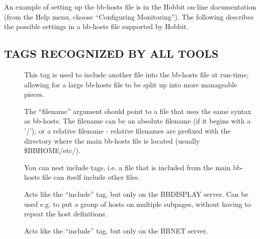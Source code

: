   An example of setting up the bb-hosts file is in the Hobbit on-line
  documentation (from the Help menu, choose ``Configuring
  Monitoring''). The following describes the possible settings in a
  bb-hosts file supported by Hobbit. 


 
\subsection{TAGS RECOGNIZED BY ALL TOOLS}


 \begin{description}
\item[] This tag is used to include another file into
  the bb-hosts file at run-time, allowing for a large bb-hosts file to
  be split up into more manageable pieces. 


  The ``filename'' argument should point to a file that uses the same
  syntax as bb-hosts. The filename can be an absolute filename (if it
  begins with a '/'), or a relative filename - relative filenames are
  prefixed with the directory where the main bb-hosts file is located
  (usually \$BBHOME/etc/). 



  You can nest include tags, i.e. a file that is included from the
  main bb-hosts file can itself include other files. 



 

\item[] Acts like the ``include'' tag, but only on
  the BBDISPLAY server. Can be used e.g. to put a group of hosts on
  multiple subpages, without having to repeat the host definitions. 


 

\item[] Acts like the ``include'' tag, but only on the BBNET server. 

 


 


\end{description}

